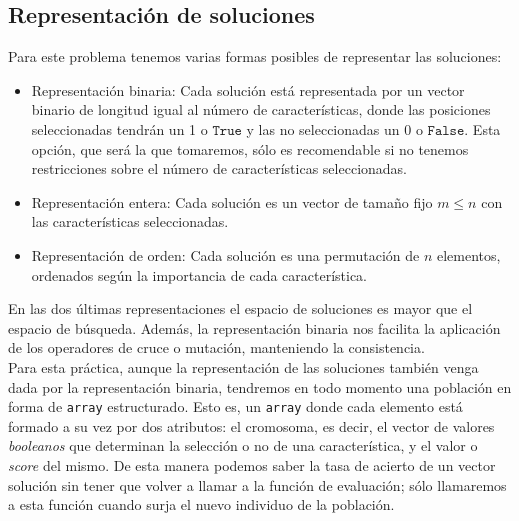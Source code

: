 \documentclass[11pt,leqno]{article}
\begin{document}
\subsection{Representación de soluciones}
	Para este problema tenemos varias formas posibles de representar las soluciones:
	\begin{itemize}
		\item Representación binaria: Cada solución está representada por un vector binario de longitud igual al número de características, donde las posiciones seleccionadas tendrán un 1 o $\texttt{True}$ y las no seleccionadas un 0 o $\texttt{False}$. Esta opción, que será la que tomaremos, sólo es recomendable si no tenemos restricciones sobre el número de características seleccionadas.
		\item Representación entera: Cada solución es un vector de tamaño fijo $m \leq n$ con las características seleccionadas.
		\item Representación de orden: Cada solución es una permutación de $n$ elementos, ordenados según la importancia de cada característica.
	\end{itemize}
	En las dos últimas representaciones el espacio de soluciones es mayor que el espacio de búsqueda. Además, la representación binaria nos facilita la aplicación de los operadores de cruce o mutación, manteniendo la consistencia.\\
	Para esta práctica, aunque la representación de las soluciones también venga dada por la representación binaria, tendremos en todo momento una población en forma de \texttt{array} estructurado. Esto es, un \texttt{array} donde cada elemento está formado a su vez por dos atributos: el cromosoma, es decir, el vector de valores \textit{booleanos} que determinan la selección o no de una característica, y el valor o \textit{score} del mismo. De esta manera podemos saber la tasa de acierto de un vector solución sin tener que volver a llamar a la función de evaluación; sólo llamaremos a esta función cuando surja el nuevo individuo de la población.
\end{document}
